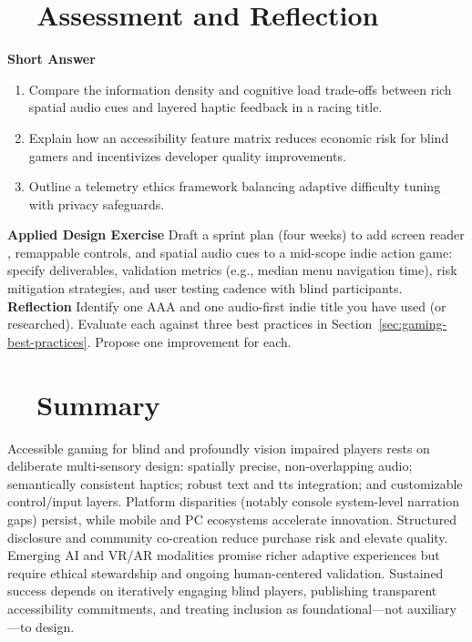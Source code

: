 \section{~~Assessment and Reflection}
\label{sec:gaming-assessment}
\textbf{Short Answer}
\begin{enumerate}
	\item Compare the information density and cognitive load trade-offs between rich spatial audio cues and layered haptic feedback in a racing title.
	\item Explain how an accessibility feature matrix reduces economic risk for blind gamers and incentivizes developer quality improvements.
	\item Outline a telemetry ethics framework balancing adaptive difficulty tuning with privacy safeguards.
\end{enumerate}
\textbf{Applied Design Exercise} Draft a sprint plan (four weeks) to add screen reader , remappable controls, and spatial audio cues to a mid-scope indie action game: specify deliverables, validation metrics (e.g., median menu navigation time), risk mitigation strategies, and user testing cadence with blind participants.
\textbf{Reflection} Identify one AAA and one audio-first indie title you have used (or researched). Evaluate each against three best practices in Section~\ref{sec:gaming-best-practices}. Propose one improvement for each.

\section{~~Summary}
\label{sec:gaming-summary}
Accessible gaming for blind and profoundly vision impaired players rests on deliberate multi-sensory design: spatially precise, non-overlapping audio; semantically consistent haptics; robust text and \gls{tts} integration; and customizable control/input layers. Platform disparities (notably console system-level narration gaps) persist, while mobile and PC ecosystems accelerate innovation. Structured disclosure and community co-creation reduce purchase risk and elevate quality. Emerging AI and VR/AR modalities promise richer adaptive experiences but require ethical stewardship and ongoing human-centered validation. Sustained success depends on iteratively engaging blind players, publishing transparent accessibility commitments, and treating inclusion as foundational—not auxiliary—to design.

